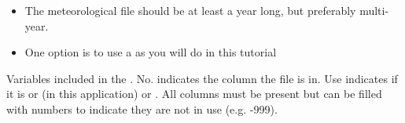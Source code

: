 \documentclass[letterpaper,10pt,english]{sphinxmanual}
\begin{document}
\begin{enumerate}
\begin{itemize}
\item {} 
The meteorological file should be at least a year long, but
preferably multi-year.

\item {} 
One option is to use a 
as you will do in this tutorial

\end{itemize}

\end{enumerate}

Variables included in the . No. indicates
the column the file is in. Use indicates if it is  or
 (in this application) or . All columns must be present but can be filled with
numbers to indicate they are not in use (e.g. -999).
\end{document}
